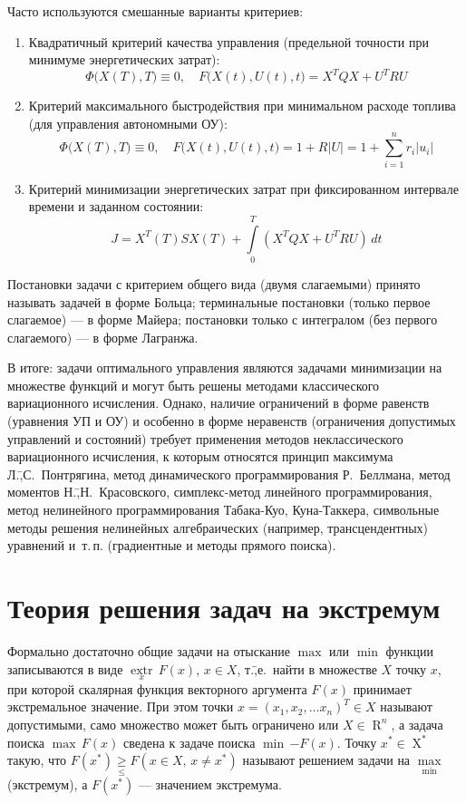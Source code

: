 \documentclass[preprint,russian,a5paper,10pt,twoside,mediummath]{ncc}
\begin{document}
Часто используются смешанные варианты критериев:
\begin{enumerate}[resume]
\item Квадратичный критерий качества управления (предельной точности при минимуме энергетических затрат):
\[ \Phi \bigl( X(T), T \bigr) \equiv 0, \quad F \bigl( X(t), U(t), t \bigr) = X^TQX + U^TRU \]
\item Критерий максимального быстродействия при минимальном расходе топлива (для управления автономными ОУ):
\[ \Phi \bigl( X(T), T \bigr) \equiv 0, \quad F \bigl( X(t), U(t), t \bigr) = 1 + R\left|U\right| = 1 + \sum\limits_{i=1}^{n}{ r_i \left| u_i \right| } \]
\item Критерий минимизации энергетических затрат при фиксированном интервале времени и заданном состоянии: 
\[ J = X^T \left( T \right) S X \left( T \right) + \int\limits_0^T \left( X^TQX + U^TRU \right) \, dt \] 
\end{enumerate}

Постановки задачи с критерием общего вида (двумя слагаемыми) принято называть задачей в форме Больца; терминальные постановки (только первое слагаемое) --- в форме Майера; постановки только с интегралом (без первого слагаемого) --- в форме Лагранжа.

В итоге: задачи оптимального управления являются задачами минимизации на множестве функций и могут быть решены методами классического вариационного исчисления. Однако, наличие ограничений в форме равенств (уравнения УП и ОУ) и особенно в форме неравенств (ограничения допустимых управлений и состояний) требует применения методов неклассического вариационного исчисления, к которым относятся принцип максимума Л.\=,С.~Понтрягина, метод динамического программирования Р.~Беллмана, метод моментов Н.\=,Н.~Красовского, симплекс-метод линейного программирования, метод нелинейного программирования Табака-Куо, Куна-Таккера, символьные методы решения нелинейных алгебраических (например, трансцендентных) уравнений и~т.\,п. (градиентные и методы прямого поиска).


\clearpage
\section{Теория решения задач на экстремум\label{extremum}}
Формально достаточно общие задачи на отыскание $\max$  или $\min$ функции записываются в виде $\underset{x}{\mathop{extr}} \, F \left( x \right) $, $ x \in X $, т.\=,е.~найти в множестве $X$ точку $x$, при которой скалярная функция векторного аргумента $F \left( x \right) $ принимает экстремальное значение. При этом точки $ x = {\left( x_1, x_2, \dots x_n \right)}^T \in X$ называют допустимыми, само множество может быть ограничено или $ X \in \mathop{R}^n $, а задача поиска $ \max \, F\left( x \right) $ сведена к задаче поиска $ \min \, { - F \left( x \right) }$. Точку $ x^* \in \mathop{X}^* $ такую, что $ F \left( x^* \right) \underset{\le}{\ge} F \left( x \in X, \, x \ne x^* \right) $ называют решением задачи на $ \underset{\min}{\max} $ (экстремум), а $ F \left( x^* \right) $ --- значением экстремума.
\end{document}
